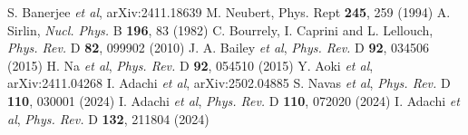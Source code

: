 \documentclass{moriond}
\def\Journal#1#2#3#4{{#1} {\bf #2}, #3 (#4)}
\def\NPB{{\em Nucl. Phys.} B}
\def\PLB{{\em Phys. Lett.}  B}
\def\PRD{{\em Phys. Rev.} D}
\begin{document}
\begin{thebibliography}{99}

S. Banerjee {\it et al}, arXiv:2411.18639
M. Neubert, \Journal{Phys. Rept}{245}{259}{1994}
A. Sirlin, \Journal{\NPB}{196}{83}{1982}
C. Bourrely, I. Caprini and L. Lellouch, \Journal{\PRD}{82}{099902}{2010}
J. A. Bailey {\it et al}, \Journal{\PRD}{92}{034506}{2015}
H. Na {\it et al}, \Journal{\PRD}{92}{054510}{2015}
Y. Aoki {\it et al}, arXiv:2411.04268
I. Adachi {\it et al}, arXiv:2502.04885
S. Navas {\it et al}, \Journal{\PRD}{110}{030001}{2024}
I. Adachi {\it et al}, \Journal{\PRD}{110}{072020}{2024}
I. Adachi {\it et al}, \Journal{\PRD}{132}{211804}{2024}


\end{thebibliography}
\end{document}
